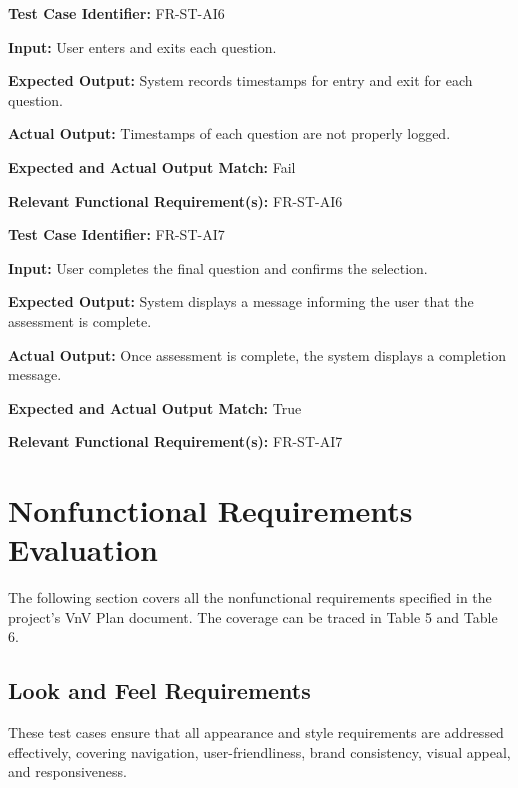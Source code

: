 \documentclass[12pt, titlepage]{article}
\begin{document}
\begin{mdframed}[linewidth=0.5mm] \par
  \textbf{Test Case Identifier:} FR-ST-AI6 \par
  \textbf{Input:} User enters and exits each question.
  \par
  \textbf{Expected Output:} System records timestamps for entry and exit for each question. \par
  \textbf{Actual Output:} Timestamps of each question are not properly logged. \par
  \textbf{Expected and Actual Output Match:} Fail  \par
  \textbf{Relevant Functional Requirement(s):}  FR-ST-AI6 
\end{mdframed}

\begin{mdframed}[linewidth=0.5mm] \par
  \textbf{Test Case Identifier:} FR-ST-AI7 \par
  \textbf{Input:} User completes the final question and confirms the selection. 
  \par
  \textbf{Expected Output:} System displays a message informing the user that the assessment is
  complete. \par
  \textbf{Actual Output:} Once assessment is complete, the system displays a completion message. \par
  \textbf{Expected and Actual Output Match:} True \par
  \textbf{Relevant Functional Requirement(s):} FR-ST-AI7
\end{mdframed}

\newpage{}

\section{Nonfunctional Requirements Evaluation}
\hspace{2em}The following section covers all the nonfunctional requirements specified in the project’s
VnV Plan document. The coverage can be traced in Table 5 and Table 6.

\subsection{Look and Feel Requirements}
\hspace{2em}These test cases ensure that all appearance and style requirements are addressed effectively, covering navigation, user-friendliness, brand consistency, visual appeal, and responsiveness.
\end{document}
